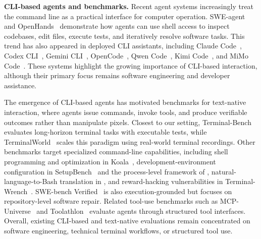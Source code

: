 \documentclass{llmxive}
\begin{document}
\noindent\textbf{CLI-based agents and benchmarks.}
Recent agent systems increasingly treat the command line as a practical interface for computer operation. SWE-agent~\citep{yang2024swe} and OpenHands~\citep{wang2025openhands} demonstrate how agents can use shell access to inspect codebases, edit files, execute tests, and iteratively resolve software tasks. This trend has also appeared in deployed CLI assistants, including Claude Code~\citep{anthropic2026claudecode}, Codex CLI~\citep{openai2025codex}, Gemini CLI~\citep{google2025geminicli}, OpenCode~\citep{opencode2026github}, Qwen Code~\citep{qwen_code2026}, Kimi Code~\citep{kimi_code2026}, and MiMo Code~\citep{mimo_code2026}. These systems highlight the growing importance of CLI-based interaction, although their primary focus remains software engineering and developer assistance.

The emergence of CLI-based agents has motivated benchmarks for text-native interaction, where agents issue commands, invoke tools, and produce verifiable outcomes rather than manipulate pixels. Closest to our setting, Terminal-Bench~\citep{merrill2026terminalbench} evaluates long-horizon terminal tasks with executable tests, while TerminalWorld~\citep{chu2026terminalworld} scales this paradigm using real-world terminal recordings. Other benchmarks target specialized command-line capabilities, including shell programming and optimization in Koala~\citep{lamprou2025koala}, development-environment configuration in SetupBench~\citep{arora2025setupbench} and the process-level framework of \citet{kuang2025process}, natural-language-to-Bash translation in \citet{westenfelder2025llm}, and reward-hacking vulnerabilities in Terminal-Wrench~\citep{bercovich2026terminal}. SWE-bench Verified~\citep{jimenez2023swe} is also execution-grounded but focuses on repository-level software repair. Related tool-use benchmarks such as MCP-Universe~\citep{luo2025mcp} and Toolathlon~\citep{li2026the} evaluate agents through structured tool interfaces. Overall, existing CLI-based and text-native evaluations remain concentrated on software engineering, technical terminal workflows, or structured tool use.
\end{document}
